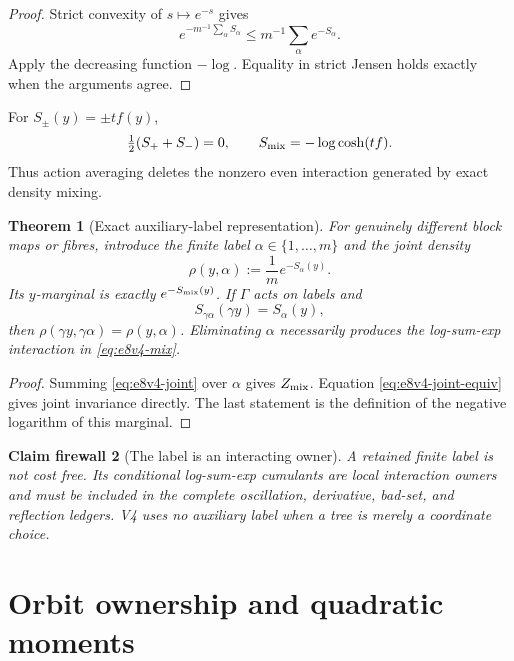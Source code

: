 \documentclass[11pt,oneside]{book}
\newtheorem{theorem}{Theorem}[chapter]
\newtheorem{firewall}[theorem]{Claim firewall}
\theoremstyle{definition}
\theoremstyle{remark}
\begin{document}
\begin{proof}
Strict convexity of \(s\mapsto e^{-s}\) gives
\[
 e^{-m^{-1}\sum_\alpha S_\alpha}
 \leq m^{-1}\sum_\alpha e^{-S_\alpha}.
\]
Apply the decreasing function \(-\log\).  Equality in strict Jensen
holds exactly when the arguments agree.
\end{proof}

\begin{example}
\label{ex:e8v4-cosh}
For \(S_\pm(y)=\pm t f(y)\),
\[
 \tfrac12(S_++S_-)=0,\qquad
 S_{\rm mix}=-\log\cosh(tf).                         \label{eq:e8v4-cosh}
\]
Thus action averaging deletes the nonzero even interaction generated
by exact density mixing.
\end{example}

\begin{theorem}[Exact auxiliary-label representation]
\label{thm:e8v4-label}
For genuinely different block maps or fibres, introduce the finite
label \(\alpha\in\{1,\ldots,m\}\) and the joint density
\[
 \rho(y,\alpha):=\frac1m e^{-S_\alpha(y)}.            \label{eq:e8v4-joint}
\]
Its \(y\)-marginal is exactly \(e^{-S_{\rm mix}(y)}\).  If
\(\Gamma\) acts on labels and
\[
 S_{\gamma\alpha}(\gamma y)=S_\alpha(y),             \label{eq:e8v4-joint-equiv}
\]
then \(\rho(\gamma y,\gamma\alpha)=\rho(y,\alpha)\).
Eliminating \(\alpha\) necessarily produces the log-sum-exp
interaction in \eqref{eq:e8v4-mix}.
\end{theorem}

\begin{proof}
Summing \eqref{eq:e8v4-joint} over \(\alpha\) gives
\(Z_{\rm mix}\).  Equation \eqref{eq:e8v4-joint-equiv} gives joint
invariance directly.  The last statement is the definition of the
negative logarithm of this marginal.
\end{proof}

\begin{firewall}[The label is an interacting owner]
\label{fire:e8v4-label}
A retained finite label is not cost free.  Its conditional
log-sum-exp cumulants are local interaction owners and must be
included in the complete oscillation, derivative, bad-set, and
reflection ledgers.  V4 uses no auxiliary label when a tree is merely
a coordinate choice.
\end{firewall}

\section{Orbit ownership and quadratic moments}
\label{sec:e8v4-orbits}
\end{document}
